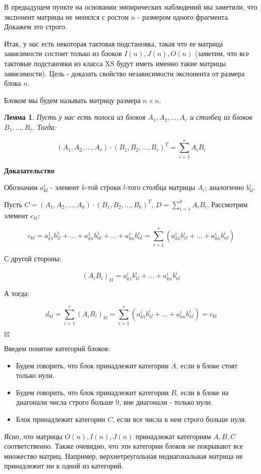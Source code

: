 \documentclass[a4paper,12pt]{report}
\theoremstyle{plain} %
\newtheorem{Lemma}{Лемма}[chapter]
\theoremstyle{definition}
\theoremstyle{remark}
\begin{document}
\begin{large}
В предыдущем пункте на основании эмпирических наблюдений мы заметили, что экспонент матрицы не менялся с ростом $n$ - размером одного фрагмента. Докажем это строго.

Итак, у нас есть некоторая тактовая подстановка, такая что ее матрица зависимости состоит только из блоков $I(n), J(n), O(n)$ (заметим, что все тактовые подстановки из класса XS будут иметь именно такие матрицы зависимости). Цель - доказать свойство независимости экспонента от размера блока $n$.

Блоком мы будем называть матрицу размера $n \times n$.

\begin{Lemma}
Пусть у нас есть полоса из блоков $A_1, A_2, ..., A_r$ и столбец из блоков $B_1, ..., B_r$. Тогда:

$$(A_1, A_2, ..., A_r) \cdot (B_1, B_2, ..., B_r)^T = \sum_{i=1}^r A_iB_i$$
\end{Lemma}

\textbf{Доказательство}

Обозначим $a_{kl}^i$ - элемент $k$-той строки $l$-того столбца матрицы $A_i$; аналогично $b_{kl}^i$.

Пусть $C = (A_1, A_2, ..., A_k ) \cdot (B_1, B_2, ..., B_k)^T $, $D =  \sum_{i=1}^k A_iB_i$. Рассмотрим элемент $c_{kl}$:

$$c_{kl} = a^1_{k1}b^1_{1l} + ... +a^1_{kn}b^1_{nl} + ... +a^r_{kn}b^r_{nl} = \sum_{i=1}^r (a^i_{k1}b^i_{1l} + ... + a^i_{kn}b^i_{nl})$$

С другой стороны:

$$(A_iB_i)_{kl} = a^i_{k1}b^i_{1l} + ... + a^i_{kn}b^i_{nl}$$

А тогда:

$$d_{kl} = \sum_{i=1}^r (A_iB_i)_{kl} =  \sum_{i=1}^r (a^i_{k1}b^i_{1l} + ... + a^i_{kn}b^i_{nl}) = c_{kl}$$

$\boxtimes$

Введем понятие категорий блоков:

\begin{itemize}
\item Будем говорить, что блок принадлежит категории $A$, если в блоке стоят только нули.

\item Будем говорить, что блок принадлежит категории $B$, если в блоке на диагонали числа строго больше 0, вне диагонали - только нули.

\item Блок принадлежит категории $C$, если все числа в нем строго больше нуля.
\end{itemize}
Ясно, что матрицы $O(n), I(n), J(n)$ принадлежат категориям $A, B, C$ соответственно. Также очевидно, что эти категории блоков не покрывают все множество матриц. Например, верхнетреугольная недиагональная матрица не принадлежит ни к одной из категорий.


\end{large}
\end{document}
